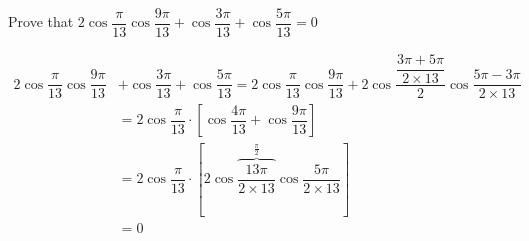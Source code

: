 
%
%
%
%
% 
% 

\question Prove that $2\cos\dfrac{\pi}{13}\cos\dfrac{9\pi}{13} + \cos\dfrac{3\pi}{13} + \cos\dfrac{5\pi}{13} = 0$

\insertQR{}

\ifprintanswers
\fi 

\begin{solution}
   \begin{fullwidth}
     \begin{align}
        2\cos\dfrac{\pi}{13}\cos\dfrac{9\pi}{13} &+ \cos\dfrac{3\pi}{13} + \cos\dfrac{5\pi}{13}
        = 2\cos\dfrac{\pi}{13}\cos\dfrac{9\pi}{13} + 
        2\cos\dfrac{\dfrac{3\pi + 5\pi}{2\times 13}}{2}\cos\dfrac{5\pi-3\pi}{2\times 13} \\
        &= 2\cos\dfrac{\pi}{13}\cdot\left[ \cos\dfrac{4\pi}{13} + \cos\dfrac{9\pi}{13} \right] \\
        &= 2\cos\dfrac{\pi}{13}\cdot\left[ 2\cos\overbrace{\dfrac{13\pi}{2\times 13}}^{\frac{\pi}{2}}\cos\dfrac{5\pi}{2\times 13}\right] \\
        &= 0
     \end{align}
   \end{fullwidth}
\end{solution}
